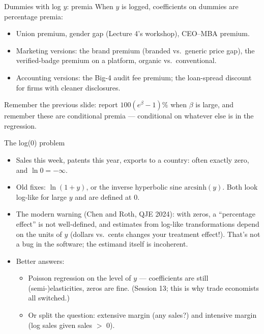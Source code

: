 \documentclass[aspectratio=169,11pt]{beamer}
\begin{document}
\begin{frame}{Dummies with log $y$: premia}
When $y$ is logged, coefficients on dummies are \alert{percentage premia}:
\begin{itemize}
	\item Union premium, gender gap (Lecture 4's workshop), CEO--MBA premium.
	\item Marketing versions: the \alert{brand premium} (branded vs.\ generic price
	gap), the \alert{verified-badge premium} on a platform, organic vs.\ conventional.
	\item Accounting versions: the Big-4 \alert{audit fee premium}; the loan-spread
	discount for firms with cleaner disclosures.
\end{itemize}
\bigskip
Remember the previous slide: report $100(e^{\beta}-1)\%$ when $\beta$ is large,
and remember these are \alert{conditional} premia --- conditional on whatever else
is in the regression.
\end{frame}


\begin{frame}{The log(0) problem}
\begin{itemize}
	\item Sales this week, patents this year, exports to a country: often
	\alert{exactly zero}, and $\ln 0 = -\infty$.

	\medskip
	\item Old fixes: $\ln(1+y)$, or the inverse hyperbolic sine
	$\mathrm{arcsinh}(y)$. Both look log-like for large $y$ and are defined at 0.

	\medskip
	\item \alert{The modern warning (Chen and Roth, QJE 2024):} with zeros, a
	``percentage effect'' is not well-defined, and estimates from log-like
	transformations \alert{depend on the units of $y$} (dollars vs.\ cents changes
	your treatment effect!). That's not a bug in the software; the estimand itself
	is incoherent.

	\medskip
	\item Better answers:
	\begin{itemize}
		\item \alert{Poisson regression} on the level of $y$ --- coefficients are
		still (semi-)elasticities, zeros are fine. (Session 13; this is why trade
		economists all switched.)
		\item Or split the question: extensive margin (any sales?) and intensive
		margin (log sales given sales $>$ 0).
	\end{itemize}
\end{itemize}
\end{frame}
\end{document}
